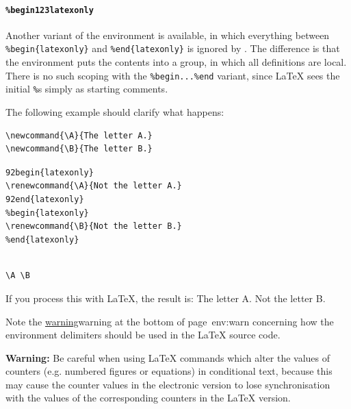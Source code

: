 %
%
%
\paragraph*{\texttt{\%begin\char123latexonly}\label{unlatexonly}}
Another variant of the  environment is available, 
in which everything between 
\texttt{\%begin\{latexonly\}} and \texttt{\%end\{latexonly\}}
is ignored by \latextohtml.  
The difference is that the  environment 
puts the contents into a group, in which all definitions are local.
There is no such scoping with the \texttt{\%begin...\%end} variant,
since \LaTeX{} sees the initial \texttt{\%}s simply as starting comments.%

\medskip
{}\html{\\}\noindent
The following example should clarify what happens:
\begin{small}
\begin{verbatim}
\newcommand{\A}{The letter A.}
\newcommand{\B}{The letter B.}
\end{verbatim}
\indent\indent\indent\texttt{\char92begin\{latexonly\}}\\
\indent\indent\verb|\renewcommand{\A}{Not the letter A.}|\\
\indent\indent\texttt{\char92end\{latexonly\}}\\
\indent\indent\texttt{\%begin\{latexonly\}}\\
\indent\indent\verb|\renewcommand{\B}{Not the letter B.}|\\
\indent\indent\texttt{\%end\{latexonly\}}
\begin{verbatim}

\A \B

\end{verbatim}
\end{small}
If you process this with \LaTeX, the result is: 
\quad\quad The letter A. Not the letter B.

\smallskip\noindent
Note the \hyperref[page]{warning}{warning at the bottom of page~}{}{env:warn}
concerning how the environment delimiters should be used in the
\LaTeX{} source code.

\medskip{}\html{\\}\noindent
\textbf{Warning: }%
Be careful when using \LaTeX{}  commands which alter the values of counters 
(e.g. numbered figures or equations) in conditional text, because this may 
cause the counter values in the electronic version to lose synchronisation 
with the values of the corresponding counters in the \LaTeX{} version.


